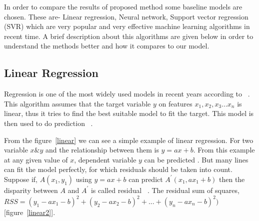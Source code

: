 In order to compare the results of proposed method some baseline models are chosen. These are- Linear regression, Neural network, Support vector regression (SVR) which are very popular and very effective machine learning algorithms in recent time. A brief description about this algorithms are given below in order to understand the methods better and how it compares to our model. 

\subsection{Linear Regression}
\label{LR}

Regression is  one of the most widely used models in recent years according to ~\cite{seber2012linear}. This algorithm assumes that the target variable $y$ on features $x_1,x_2,x_3 ... x_n$ is linear, thus it tries to find the best suitable model to fit the target. This model is then used to do prediction ~\cite {han2011data}. 

\begin{figure}
\centering
{}
\end{figure}

From the figure~\ref{linear} we can see a simple example of linear regression. For two variable $x  \&  y$ and the relationship between them is $y=ax+b$. From this example at any given value of $x$, dependent variable $y$  can be predicted . But many lines can fit the model perfectly, for which residuals should be taken into count. Suppose if,  $A(x_1,y_1)$ using $y=ax+b$ can predict $A^\prime(x_1,ax_1+b) $ then the disparity between $A$ and $A^\prime$ is called residual ~\cite{montgomery2012wiley}. The residual sum of squares, $ RSS = (y_1-ax_1-b)^2 +(y_2 - ax_2 - b )^2 + ... + (y_n-ax_n-b)^2)$ [figure~\ref{linear2}].


